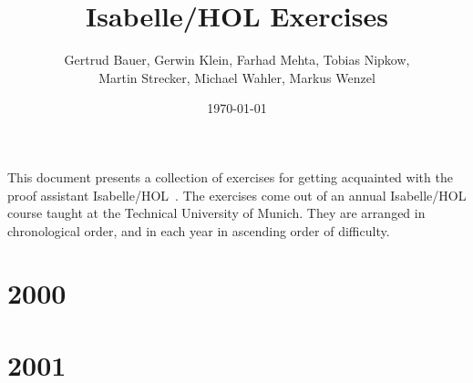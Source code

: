 
\usepackage{graphicx}
\usepackage[colorlinks,hyperindex]{hyperref}

\newcommand{\aufgabe}[3]{

}

\title{Isabelle/HOL Exercises}
\date{\today}
\author{Gertrud Bauer, Gerwin Klein, Farhad Mehta, Tobias Nipkow,\\ 
  Martin Strecker, Michael Wahler, Markus Wenzel}



\maketitle

This document presents a collection of exercises for getting
acquainted with the proof assistant
Isabelle/HOL~\cite{isabelle-tutorial}.  The exercises come out of an
annual Isabelle/HOL course taught at the Technical University of
Munich. They are arranged in chronological order, and in each year in
ascending order of difficulty.

\tableofcontents


\newpage
\section{2000}
\aufgabe{2000}{a1}{Snoc}
\aufgabe{2000}{a1}{Arithmetic}
\aufgabe{2000}{a1}{Hanoi}


\newpage
\section{2001}
\aufgabe{2001}{a1}{Aufgabe1}
\aufgabe{2001}{a2}{Aufgabe2}
\aufgabe{2001}{a3}{Trie1}
\aufgabe{2001}{a3}{Trie2}
\aufgabe{2001}{a3}{Trie3}
\aufgabe{2001}{a5}{Aufgabe5}

